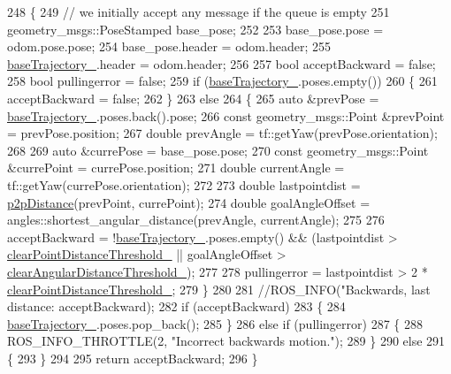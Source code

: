 \begin{DoxyCode}
248 \{
249     \textcolor{comment}{// we initially accept any message if the queue is empty}
251 \textcolor{comment}{}    geometry\_msgs::PoseStamped base\_pose;
252 
253     base\_pose.pose = odom.pose.pose;
254     base\_pose.header = odom.header;
255     \hyperlink{classcl__move__base__z_1_1odom__tracker_1_1OdomTracker_a466d18a86df049f0f680e043bb5ea91f}{baseTrajectory\_}.header = odom.header;
256 
257     \textcolor{keywordtype}{bool} acceptBackward = \textcolor{keyword}{false};
258     \textcolor{keywordtype}{bool} pullingerror = \textcolor{keyword}{false};
259     \textcolor{keywordflow}{if} (\hyperlink{classcl__move__base__z_1_1odom__tracker_1_1OdomTracker_a466d18a86df049f0f680e043bb5ea91f}{baseTrajectory\_}.poses.empty())
260     \{
261         acceptBackward = \textcolor{keyword}{false};
262     \}
263     \textcolor{keywordflow}{else}
264     \{
265         \textcolor{keyword}{auto} &prevPose = \hyperlink{classcl__move__base__z_1_1odom__tracker_1_1OdomTracker_a466d18a86df049f0f680e043bb5ea91f}{baseTrajectory\_}.poses.back().pose;
266         \textcolor{keyword}{const} geometry\_msgs::Point &prevPoint = prevPose.position;
267         \textcolor{keywordtype}{double} prevAngle = tf::getYaw(prevPose.orientation);
268 
269         \textcolor{keyword}{auto} &currePose = base\_pose.pose;
270         \textcolor{keyword}{const} geometry\_msgs::Point &currePoint = currePose.position;
271         \textcolor{keywordtype}{double} currentAngle = tf::getYaw(currePose.orientation);
272 
273         \textcolor{keywordtype}{double} lastpointdist = \hyperlink{namespacecl__move__base__z_1_1odom__tracker_a501582a760a02ce0069d95bfc67ca973}{p2pDistance}(prevPoint, currePoint);
274         \textcolor{keywordtype}{double} goalAngleOffset = angles::shortest\_angular\_distance(prevAngle, currentAngle);
275 
276         acceptBackward = !\hyperlink{classcl__move__base__z_1_1odom__tracker_1_1OdomTracker_a466d18a86df049f0f680e043bb5ea91f}{baseTrajectory\_}.poses.empty() && (lastpointdist > 
      \hyperlink{classcl__move__base__z_1_1odom__tracker_1_1OdomTracker_a7155d25d0e8dd9f237a79ff503b80e26}{clearPointDistanceThreshold\_} || goalAngleOffset > 
      \hyperlink{classcl__move__base__z_1_1odom__tracker_1_1OdomTracker_a1b79dd86745adfb31db822e0c8106282}{clearAngularDistanceThreshold\_});
277 
278         pullingerror = lastpointdist > 2 * \hyperlink{classcl__move__base__z_1_1odom__tracker_1_1OdomTracker_a7155d25d0e8dd9f237a79ff503b80e26}{clearPointDistanceThreshold\_};
279     \}
280 
281     \textcolor{comment}{//ROS\_INFO("Backwards, last distance: %
       acceptBackward);}
282     \textcolor{keywordflow}{if} (acceptBackward)
283     \{
284         \hyperlink{classcl__move__base__z_1_1odom__tracker_1_1OdomTracker_a466d18a86df049f0f680e043bb5ea91f}{baseTrajectory\_}.poses.pop\_back();
285     \}
286     \textcolor{keywordflow}{else} \textcolor{keywordflow}{if} (pullingerror)
287     \{
288         ROS\_INFO\_THROTTLE(2, \textcolor{stringliteral}{"Incorrect backwards motion."});
289     \}
290     \textcolor{keywordflow}{else}
291     \{
293     \}
294 
295     \textcolor{keywordflow}{return} acceptBackward;
296 \}
\end{DoxyCode}
